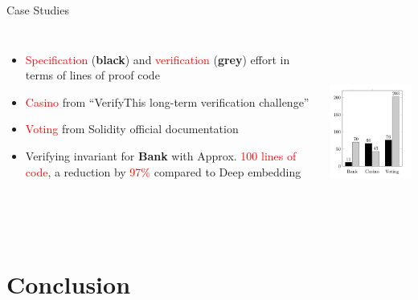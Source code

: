 \documentclass[aspectratio=169]{beamer}
\begin{document}
\begin{frame}{Case Studies}
\begin{columns}
\begin{itemize}
\item \textcolor{red}{Specification} (\textbf{black}) and \textcolor{red}{verification} (\textbf{grey}) effort in terms of lines of proof code
\item \textcolor{red}{Casino} from “VerifyThis long-term verification
challenge”
\item \textcolor{red}{Voting} from Solidity official documentation
\item Verifying invariant for \textbf{Bank} with Approx. \textcolor{red}{100 lines of code}, a reduction by \textcolor{red}{ 97\%} compared to Deep embedding 


\end{itemize}

\includegraphics[width=\columnwidth, height=6cm,
  keepaspectratio]{graph.png}
\end{columns}
\end{frame}
%
\section{Conclusion}
\frame{\tableofcontents[currentsection]}
\end{document}
